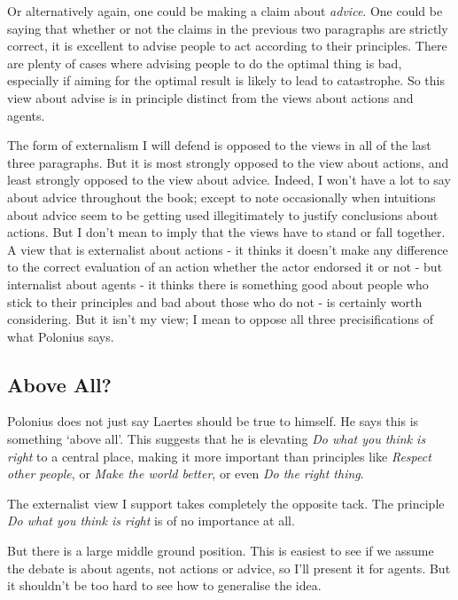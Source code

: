 \documentclass[
  10pt,
  letterpaper,
  twoside]{scrbook}
\begin{document}
Or alternatively again, one could be making a claim about \emph{advice}.
One could be saying that whether or not the claims in the previous two
paragraphs are strictly correct, it is excellent to advise people to act
according to their principles. There are plenty of cases where advising
people to do the optimal thing is bad, especially if aiming for the
optimal result is likely to lead to catastrophe. So this view about
advise is in principle distinct from the views about actions and agents.

The form of externalism I will defend is opposed to the views in all of
the last three paragraphs. But it is most strongly opposed to the view
about actions, and least strongly opposed to the view about advice.
Indeed, I won't have a lot to say about advice throughout the book;
except to note occasionally when intuitions about advice seem to be
getting used illegitimately to justify conclusions about actions. But I
don't mean to imply that the views have to stand or fall together. A
view that is externalist about actions - it thinks it doesn't make any
difference to the correct evaluation of an action whether the actor
endorsed it or not - but internalist about agents - it thinks there is
something good about people who stick to their principles and bad about
those who do not - is certainly worth considering. But it isn't my view;
I mean to oppose all three precisifications of what Polonius says.

\subsection{Above All?}\label{aboveall}

Polonius does not just say Laertes should be true to himself. He says
this is something `above all'. This suggests that he is elevating
\emph{Do what you think is right} to a central place, making it more
important than principles like \emph{Respect other people}, or
\emph{Make the world better}, or even \emph{Do the right thing}.

The externalist view I support takes completely the opposite tack. The
principle \emph{Do what you think is right} is of no importance at all.

But there is a large middle ground position. This is easiest to see if
we assume the debate is about agents, not actions or advice, so I'll
present it for agents. But it shouldn't be too hard to see how to
generalise the idea.
\end{document}
